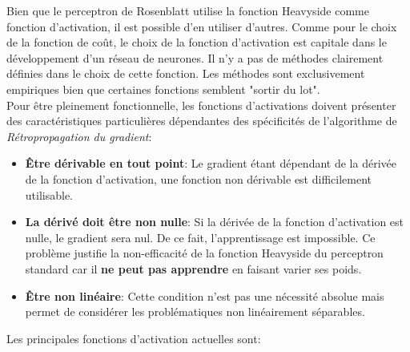 \noindent Bien que le perceptron de Rosenblatt utilise la fonction Heavyside comme fonction d'activation, il est possible d'en utiliser d'autres. Comme pour le choix de la fonction de coût, le choix de la fonction d'activation est capitale dans le développement d'un réseau de neurones. Il n'y a pas de méthodes clairement définies dans le choix de cette fonction. Les méthodes sont exclusivement empiriques bien que certaines fonctions semblent "sortir du lot"\cite{loss_deep}. \\

\noindent Pour être pleinement fonctionnelle, les fonctions d'activations doivent présenter des caractéristiques particulières dépendantes des spécificités de l'algorithme de \textit{Rétropropagation du gradient}:
\begin{itemize}
    \item \textbf{Être dérivable en tout point}: Le gradient étant dépendant de la dérivée de la fonction d'activation, une fonction non dérivable est difficilement utilisable.
    \item \textbf{La dérivé doit être non nulle}: Si la dérivée de la fonction d'activation est nulle, le gradient sera nul. De ce fait, l'apprentissage est impossible. Ce problème justifie la non-efficacité de la fonction Heavyside du perceptron standard car il \textbf{ne peut pas apprendre} en faisant varier ses poids.
    \item \textbf{Être non linéaire}: Cette condition n'est pas une nécessité absolue mais permet de considérer les problématiques non linéairement séparables.
\end{itemize}
\noindent Les principales fonctions d'activation actuelles sont:

